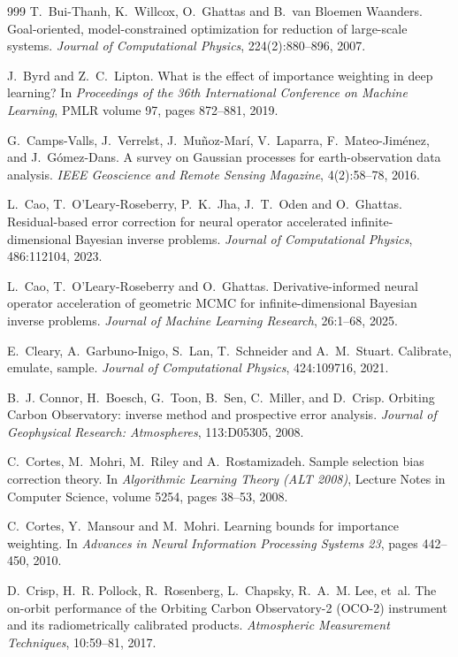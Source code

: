 \begin{thebibliography}{999}
T.~Bui-Thanh, K.~Willcox, O.~Ghattas and B.~van Bloemen Waanders.
\newblock Goal-oriented, model-constrained optimization for reduction of large-scale systems.
\newblock \emph{Journal of Computational Physics}, 224(2):880--896, 2007.

J.~Byrd and Z.~C.~Lipton.
\newblock What is the effect of importance weighting in deep learning?
\newblock In \emph{Proceedings of the 36th International Conference on Machine Learning}, PMLR volume 97, pages 872--881, 2019.

G.~Camps-Valls, J.~Verrelst, J.~Mu\~noz-Mar\'i, V.~Laparra, F.~Mateo-Jim\'enez, and
J.~G\'omez-Dans.
\newblock A survey on {Gaussian} processes for earth-observation data analysis.
\newblock \emph{IEEE Geoscience and Remote Sensing Magazine}, 4(2):58--78, 2016.

L.~Cao, T.~O'Leary-Roseberry, P.~K.~Jha, J.~T.~Oden and O.~Ghattas.
\newblock Residual-based error correction for neural operator accelerated infinite-dimensional Bayesian inverse problems.
\newblock \emph{Journal of Computational Physics}, 486:112104, 2023.

L.~Cao, T.~O'Leary-Roseberry and O.~Ghattas.
\newblock Derivative-informed neural operator acceleration of geometric MCMC for infinite-dimensional Bayesian inverse problems.
\newblock \emph{Journal of Machine Learning Research}, 26:1--68, 2025.

E.~Cleary, A.~Garbuno-Inigo, S.~Lan, T.~Schneider and A.~M.~Stuart.
\newblock Calibrate, emulate, sample.
\newblock \emph{Journal of Computational Physics}, 424:109716, 2021.

B.~J. Connor, H.~Boesch, G.~Toon, B.~Sen, C.~Miller, and D.~Crisp.
\newblock Orbiting {Carbon} {Observatory}: inverse method and prospective error analysis.
\newblock \emph{Journal of Geophysical Research: Atmospheres}, 113:D05305, 2008.

C.~Cortes, M.~Mohri, M.~Riley and A.~Rostamizadeh.
\newblock Sample selection bias correction theory.
\newblock In \emph{Algorithmic Learning Theory (ALT 2008)}, Lecture Notes in Computer Science, volume 5254, pages 38--53, 2008.

C.~Cortes, Y.~Mansour and M.~Mohri.
\newblock Learning bounds for importance weighting.
\newblock In \emph{Advances in Neural Information Processing Systems 23}, pages 442--450, 2010.

D.~Crisp, H.~R. Pollock, R.~Rosenberg, L.~Chapsky, R.~A.~M. Lee, et~al.
\newblock The on-orbit performance of the {Orbiting Carbon Observatory-2} ({OCO-2}) instrument and
its radiometrically calibrated products.
\newblock \emph{Atmospheric Measurement Techniques}, 10:59--81, 2017.


\end{thebibliography}
